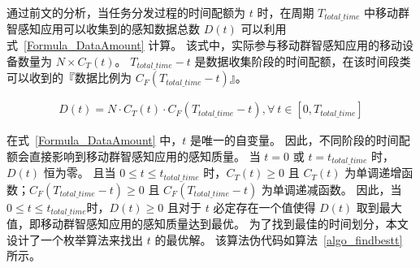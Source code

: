 通过前文的分析，当任务分发过程的时间配额为 $t$ 时，在周期 $T_{total\_time}$ 中移动群智感知应用可以收集到的感知数据总数 $D(t)$ 可以利用式~\eqref{Formula_DataAmount} 计算。
该式中，实际参与移动群智感知应用的移动设备数量为 $N\times C_T(t)$。
$T_{total\_time}-t$ 是数据收集阶段的时间配额，在该时间段类可以收到的『数据比例为 $C_F(T_{total\_time}-t)$』。

\begin{equation}
  \label{Formula_DataAmount}
  \begin{gathered}
  D(t) = N \cdot C_T(t) \cdot C_F(T_{total\_time}-t),\forall \ t \in [0, T_{total\_time}]
  \end{gathered}
\end{equation}

在式~\eqref{Formula_DataAmount} 中，$t$ 是唯一的自变量。
因此，不同阶段的时间配额会直接影响到移动群智感知应用的感知质量。
当 $t=0$ 或 $t=t_{total\_time}$ 时，$D(t)$ 恒为零。
且当 $0 \leq t \leq t_{total\_time}$ 时，$C_T(t)\geq 0$ 且 $C_T(t)$ 为单调递增函数；$C_F(T_{total\_time}-t) \geq 0$ 且 $C_F(T_{total\_time}-t)$ 为单调递减函数。
因此，当$0 \leq t \leq t_{total\_time}$时，$D(t) \geq 0$ 且对于 $t$ 必定存在一个值使得 $D(t)$ 取到最大值，即移动群智感知应用的感知质量达到最优。
为了找到最佳的时间划分，本文设计了一个枚举算法来找出 $t$ 的最优解。
该算法伪代码如算法~\ref{algo_findbestt} 所示。


